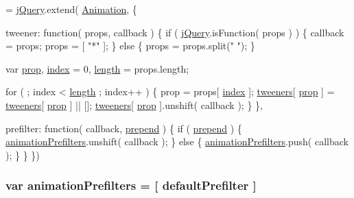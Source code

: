 \begin{DoxyCode}
= \hyperlink{jquery-1_810_82_8js_a5e01048fbd3a30b44e8d491d8945c457}{jQuery}.extend( \hyperlink{jquery-1_810_82_8js_a3299b781c8ec8287357326920ab3565a}{Animation}, \{

    tweener: \textcolor{keyword}{function}( props, callback ) \{
        \textcolor{keywordflow}{if} ( \hyperlink{jquery-1_810_82_8js_a5e01048fbd3a30b44e8d491d8945c457}{jQuery}.isFunction( props ) ) \{
            callback = props;
            props = [ \textcolor{stringliteral}{"*"} ];
        \} \textcolor{keywordflow}{else} \{
            props = props.split(\textcolor{stringliteral}{" "});
        \}

        var \hyperlink{jquery-1_810_82-vsdoc_8js_af17be84954030af6c2286f5da385d41b}{prop},
            \hyperlink{jquery-1_810_82-vsdoc_8js_a75bb12d1f23302a9eea93a6d89d0193e}{index} = 0,
            \hyperlink{jquery-1_810_82-vsdoc_8js_aa7de35d58da66d9944ab9cbe82c19640}{length} = props.length;

        \textcolor{keywordflow}{for} ( ; index < \hyperlink{jquery-1_810_82-vsdoc_8js_aa7de35d58da66d9944ab9cbe82c19640}{length} ; index++ ) \{
            prop = props[ \hyperlink{jquery-1_810_82-vsdoc_8js_a75bb12d1f23302a9eea93a6d89d0193e}{index} ];
            \hyperlink{jquery-1_810_82_8js_a948afd2431eec272c99689edddfb6850}{tweeners}[ \hyperlink{jquery-1_810_82-vsdoc_8js_af17be84954030af6c2286f5da385d41b}{prop} ] = \hyperlink{jquery-1_810_82_8js_a948afd2431eec272c99689edddfb6850}{tweeners}[ \hyperlink{jquery-1_810_82-vsdoc_8js_af17be84954030af6c2286f5da385d41b}{prop} ] || [];
            \hyperlink{jquery-1_810_82_8js_a948afd2431eec272c99689edddfb6850}{tweeners}[ \hyperlink{jquery-1_810_82-vsdoc_8js_af17be84954030af6c2286f5da385d41b}{prop} ].unshift( callback );
        \}
    \},

    prefilter: \textcolor{keyword}{function}( callback, \hyperlink{jquery-1_810_82-vsdoc_8js_a2d1a98145e139b1aea1d95967466b151}{prepend} ) \{
        \textcolor{keywordflow}{if} ( \hyperlink{jquery-1_810_82-vsdoc_8js_a2d1a98145e139b1aea1d95967466b151}{prepend} ) \{
            \hyperlink{jquery-1_810_82_8js_adb3f17c5359fbc12b7043b6969553d78}{animationPrefilters}.unshift( callback );
        \} \textcolor{keywordflow}{else} \{
            \hyperlink{jquery-1_810_82_8js_adb3f17c5359fbc12b7043b6969553d78}{animationPrefilters}.push( callback );
        \}
    \}
\})
\end{DoxyCode}
\hypertarget{jquery-1_810_82_8js_adb3f17c5359fbc12b7043b6969553d78}{
\subsubsection[{animation\-Prefilters}]{\setlength{\rightskip}{0pt plus 5cm}var animation\-Prefilters = \mbox{[} {\bf default\-Prefilter} \mbox{]}}}\label{jquery-1_810_82_8js_adb3f17c5359fbc12b7043b6969553d78}
